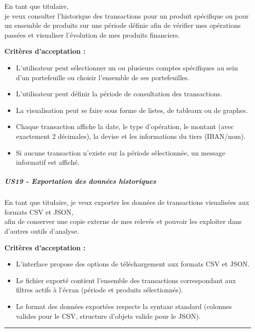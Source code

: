 En tant que titulaire,\\
je veux consulter l'historique des transactions pour un produit
spécifique ou pour un ensemble de produits sur une période définie afin
de vérifier mes opérations passées et visualiser l'évolution de mes
produits financiers.

\textbf{Critères d'acceptation :}

\begin{itemize}
\tightlist
\item
  L'utilisateur peut sélectionner un ou plusieurs comptes spécifiques au
  sein d'un portefeuille ou choisir l'ensemble de ses portefeuilles.
\item
  L'utilisateur peut définir la période de consultation des
  transactions.
\item
  La visualisation peut se faire sous forme de listes, de tableaux ou de
  graphes.
\item
  Chaque transaction affiche la date, le type d'opération, le montant
  (avec exactement 2 décimales), la devise et les informations du tiers
  (IBAN/nom).
\item
  Si aucune transaction n'existe sur la période sélectionnée, un message
  informatif est affiché.
\end{itemize}

\hypertarget{us19---exportation-des-donnuxe9es-historiques}{%
\subparagraph{US19 - Exportation des données
historiques}\label{us19---exportation-des-donnuxe9es-historiques}}

En tant que titulaire, je veux exporter les données de transactions
visualisées aux formats CSV et JSON,\\
afin de conserver une copie externe de mes relevés et pouvoir les
exploiter dans d'autres outils d'analyse.

\textbf{Critères d'acceptation :}

\begin{itemize}
\tightlist
\item
  L'interface propose des options de téléchargement aux formats CSV et
  JSON.
\item
  Le fichier exporté contient l'ensemble des transactions correspondant
  aux filtres actifs à l'écran (période et produits sélectionnés).
\item
  Le format des données exportées respecte la syntaxe standard (colonnes
  valides pour le CSV, structure d'objets valide pour le JSON).
\end{itemize}

\begin{center}\rule{0.5\linewidth}{0.5pt}\end{center}

